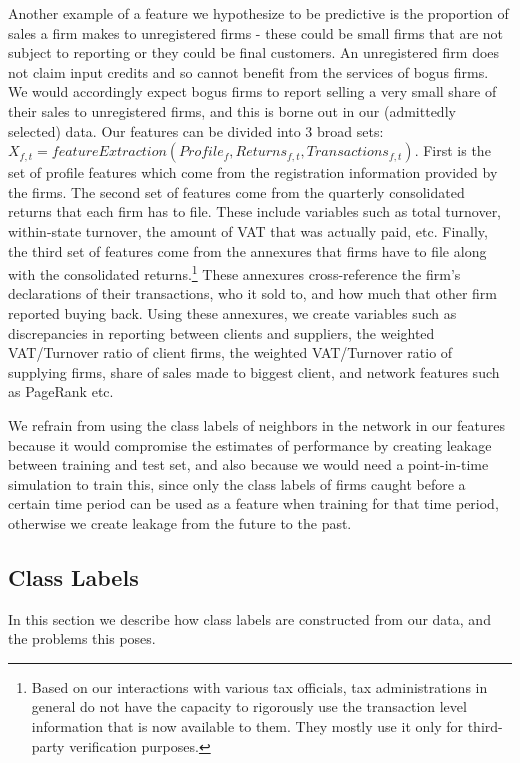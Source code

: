 Another example of a feature we hypothesize to be predictive is the proportion of sales a firm makes to unregistered firms - these could be small firms that are not subject to reporting or they could be final customers. An unregistered firm does not claim input credits and so cannot benefit from the services of bogus firms. We would accordingly expect bogus firms to report selling a very small share of their sales to unregistered firms, and this is borne out in our (admittedly selected) data.
Our features can be divided into 3 broad sets: $X_{f,t}=featureExtraction(Profile_f, Returns_{f,t},Transactions_{f,t})$. First is the set of profile features which come from the registration information provided by the firms. The second set of features come from the quarterly consolidated returns that each firm has to file. These include variables such as total turnover, within-state turnover, the amount of VAT that was actually paid, etc. 
Finally, the third set of features come from the annexures that firms have to file along with the consolidated returns.\footnote{Based on our interactions with various tax officials, tax administrations in general do not have the capacity to rigorously use the transaction level information that is now available to them. They mostly use it only for third-party verification purposes.} These annexures cross-reference the firm's declarations of their transactions, who it sold to, and how much that other firm reported buying back. Using these annexures, we create variables such as discrepancies in reporting between clients and suppliers, the weighted VAT/Turnover ratio of client firms, the weighted VAT/Turnover ratio of supplying firms, share of sales made to biggest client, and network features such as PageRank etc. 

We refrain from using the class labels of neighbors in the network in our features because it would compromise the estimates of performance by creating leakage between training and test set, and also because we would need a point-in-time simulation to train this, since only the class labels of firms caught before a certain time period can be used as a feature when training for that time period, otherwise we create leakage from the future to the past. 

\subsection{Class Labels}
\label{subsec:class-labels} 
In this section we describe how class labels are constructed from our data, and the problems this poses.

